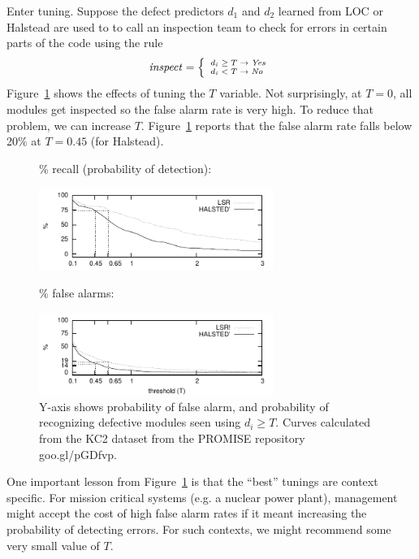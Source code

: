\documentclass{sig-alternative}
\newcommand{\fig}[1]{Figure~\ref{fig:#1}}
\begin{document}
\noindent
Enter tuning. Suppose the defect predictors $d_1$ and $d_2$  learned from LOC or Halstead
are used to to call an inspection
team to check for errors in certain parts of the code using the rule
\begin{equation}\label{eq:yesno}\scriptsize
\mathit{inspect}= \left\{
\begin{array}{ll}
d_i \ge T \rightarrow \mathit{Yes}\\
d_i <   T \rightarrow \mathit{No} 
\end{array}\right.
\end{equation}
\fig{pd1} shows the effects of tuning the $T$ variable. Not surprisingly,
at $T=0$, all modules get inspected so the false alarm rate is very high. To reduce that
problem, we can increase $T$. \fig{pd1} reports that the false alarm rate falls below
20\% at $T=0.45$ (for Halstead). 

 

\begin{figure}[!t]
{\scriptsize
\begin{center}

\% recall (probability of detection):   

\includegraphics[width=3in]{lsrvscostpd.pdf}

\% false alarms:

\includegraphics[width=3in]{lsrvscostpf.pdf}
\end{center}}
\caption{
 Y-axis shows probability of false alarm,
  and
  probability of recognizing defective modules  seen using \mbox{$d_i \ge T$}.
  Curves calculated from the KC2 dataset from the PROMISE repository goo.gl/pGDfvp.
 }\label{fig:pd1}
 \end{figure}


One  important lesson from  \fig{pd1} is that the ``best'' tunings are context
specific. For mission critical systems (e.g. a nuclear power plant), management
might accept the cost of high false alarm rates if it meant increasing the probability
of detecting errors. For such contexts, we might recommend some very small value of $T$.
\end{document}
